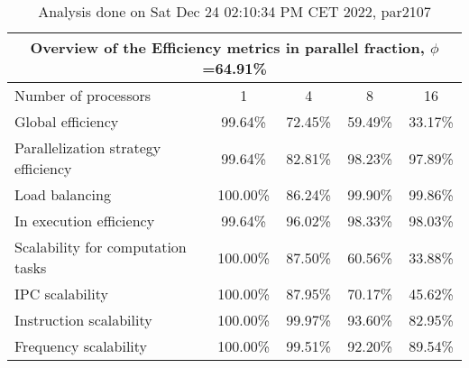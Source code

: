 \begin{table}[h]
\begin{center}
\begin{tabular}{|l|c|c|c|c|}
\hline
\multicolumn{5}{|c|}{Overview of the Efficiency metrics in parallel fraction, $\phi$=64.91\%} \\
\hline
\hline
Number of processors & 1 & 4 & 8 & 16 \\
\hline
\hline
Global efficiency                      &     99.64\% &     72.45\% &     59.49\% &     33.17\% \\
\hline
\hline
Parallelization strategy efficiency &     99.64\% &     82.81\% &     98.23\% &     97.89\% \\
\hline
Load balancing                   &    100.00\% &     86.24\% &     99.90\% &     99.86\% \\
In execution efficiency          &     99.64\% &     96.02\% &     98.33\% &     98.03\% \\
\hline
\hline
Scalability for computation tasks   &    100.00\% &     87.50\% &     60.56\% &     33.88\% \\
\hline
IPC scalability                  &    100.00\% &     87.95\% &     70.17\% &     45.62\% \\
Instruction scalability          &    100.00\% &     99.97\% &     93.60\% &     82.95\% \\
Frequency scalability            &    100.00\% &     99.51\% &     92.20\% &     89.54\% \\
\hline
\end{tabular}
\end{center}
\caption{ Analysis done on Sat Dec 24 02:10:34 PM CET 2022, par2107}
\end{table}
